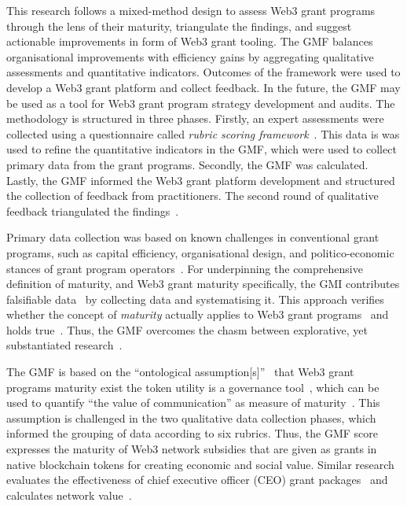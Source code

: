 \documentclass[conference]{IEEEtran}
\begin{document}
This research follows a mixed-method design to assess Web3 grant programs through the lens of their maturity, triangulate the findings, and suggest actionable improvements in form of Web3 grant tooling. The GMF balances organisational improvements with efficiency gains by aggregating qualitative assessments and quantitative indicators. Outcomes of the framework were used to develop a Web3 grant platform and collect feedback. In the future, the GMF may be used as a tool for Web3 grant program strategy development and audits. The methodology is structured in three phases. Firstly, an expert assessments were collected using a questionnaire called \textit{rubric scoring framework}~\cite{biedermann_evaluating_2024}. This data is was used to refine the quantitative indicators in the GMF, which were used to collect primary data from the grant programs. Secondly, the GMF was calculated. Lastly, the GMF informed the Web3 grant platform development and structured the collection of feedback from practitioners. The second round of qualitative feedback triangulated the findings~\cite{creswell_designing_2017,datta_paradigm_2006}.

Primary data collection was based on known challenges in conventional grant programs, such as capital efficiency, organisational design, and politico-economic stances of grant program operators~\cite{lerner_government_2000}. For underpinning the comprehensive definition of maturity, and Web3 grant maturity specifically, the GMI contributes falsifiable data~\cite[p.~17]{popper_objective_1973} by collecting data and systematising it. This approach verifies whether the concept of \textit{maturity} actually applies to Web3 grant programs~\cite[p.~7]{santos_dao_2018} and holds true~\cite{hutton_abstraction_1990}. Thus, the GMF overcomes the chasm between explorative, yet substantiated research~\cite{mukumbang_retroductive_2023}.

The GMF is based on the ``ontological assumption[s]''~\cite[pp.~94]{mukumbang_retroductive_2023} that Web3 grant programs maturity exist the token utility is a governance tool~\cite{beck_governance_2018,messias_understanding_2024}, which can be used to quantify ``the value of communication'' as measure of maturity~\cite{johansson_roadmap_2019}. This assumption is challenged in the two qualitative data collection phases, which informed the grouping of data according to six rubrics. Thus, the GMF score expresses the maturity of Web3 network subsidies that are given as grants in native blockchain tokens for creating economic and social value. Similar research evaluates the effectiveness of chief executive officer (CEO) grant packages~\cite{billett_stockholder_2010} and calculates network value~\cite{papaioannou_business_2023}.
\end{document}
